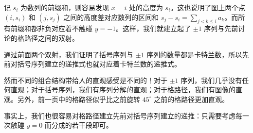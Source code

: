     \begin{center}
    \end{center}

    记 $s_i$ 为数列的前缀和，则容易发现 $x=i$ 处的高度为 $s_i$。这也说明了图上两个点 $(i,s_i)$ 和 $(j,s_j)$ 之间的高度差对应数列的区间和 $s_j-s_i=\sum_{j<k\le i}a_k$。而所有前缀和都非负对应着不触碰 $y=-1$。这样，我们就建立起了 $\pm 1$ 序列与先前讨论的格路径之间的双射。
    \begin{remark}
        通过前面两个双射，我们证明了括号序列与 $\pm 1$ 序列的数量都是卡特兰数，所以先前对括号序列建立的递推式也就对应着卡特兰数的递推式。

        然而不同的组合结构带给人的直观感受是不同的！对于 $\pm 1$ 序列，我们几乎没有任何直观；对于括号序列，我们有序列分解的直观；对于格路径，我们有图像的直观。另外，前一页中的格路径似乎比之前旋转 $45^\circ$ 之前的格路径更加直观。
        
        事实上，我们也很容易对格路径建立先前对括号序列建立的递推：只需要考虑每一次触碰 $y=0$ 而分成的若干段即可。
    \end{remark}

